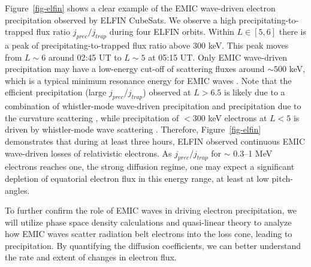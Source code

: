\documentclass[
  letterpaper,
  DIV=11,
  numbers=noendperiod]{scrartcl}
\begin{document}
Figure~\ref{fig-elfin} shows a clear example of the EMIC wave-driven electron precipitation observed by ELFIN CubeSats. We observe a high precipitating-to-trapped flux ratio \(j_{prec}/j_{trap}\) during four ELFIN orbits.
Within \(L \in [5,6]\) there is a peak of precipitating-to-trapped flux ratio above \(300\) keV. This peak moves from \(L \sim 6\) around 02:45 UT to \(L \sim 5\) at 05:15 UT. Only EMIC wave-driven precipitation may have a low-energy cut-off of scattering fluxes around \(\sim 500\) keV, which is a typical minimum resonance energy for EMIC waves \citep[see the identification of other EMIC wave-driven precipitation events with similar precipitating-to-trapped ratios in][]{anNonresonantScatteringRelativistic2022, angelopoulosEnergeticElectronPrecipitation2023}. Note that the efficient precipitation (large \(j_{prec}/j_{trap}\)) observed at \(L>6.5\) is likely due to a combination of whistler-mode wave-driven precipitation \citep{shiRoleULFWaves2022} and precipitation due to the curvature scattering \citep{wilkinsStatisticalCharacteristicsElectron2023}, while precipitation of \(<300\) keV electrons at \(L<5\) is driven by whistler-mode wave scattering \citep[see similar examples of quasi-periodical precipitation on the dusk flank in][]{artemyevRoleDuctingRelativistic2021}.
Therefore, Figure~\ref{fig-elfin} demonstrates that during at least three hours, ELFIN observed continuous EMIC wave-driven losses of relativistic electrons. As \(j_{prec}/j_{trap}\) for \(\sim\) 0.3--1 MeV electrons reaches one, the strong diffusion regime, one may expect a significant depletion of equatorial electron flux in this energy range, at least at low pitch-angles.

To further confirm the role of EMIC waves in driving electron precipitation, we will utilize phase space density calculations and quasi-linear theory to analyze how EMIC waves scatter radiation belt electrons into the loss cone, leading to precipitation. By quantifying the diffusion coefficients, we can better understand the rate and extent of changes in electron flux.
\end{document}
